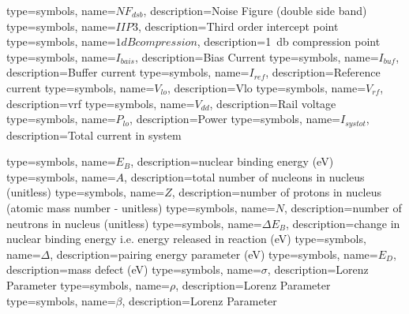 
{
    type=symbols,
    name={\ensuremath{NF_{dsb}}},
    description={Noise Figure (double side band)}
}
{
    type=symbols,
    name={\ensuremath{IIP3}},
    description={Third order intercept point}
}
{
    type=symbols,
    name={\ensuremath{1dB compression}},
    description={\SI{1}{\decibel} compression point}
}
{
    type=symbols,
    name={\ensuremath{I_{bais}}},
    description={Bias Current}
}
{
    type=symbols,
    name={\ensuremath{I_{buf}}},
    description={Buffer current}
}
{
    type=symbols,
    name={\ensuremath{I_{ref}}},
    description={Reference current}
}
{
    type=symbols,
    name={\ensuremath{V_{lo}}},
    description={Vlo}
}
{
    type=symbols,
    name={\ensuremath{V_{rf}}},
    description={vrf}
}
{
    type=symbols,
    name={\ensuremath{V_{dd}}},
    description={Rail voltage}
}
{
    type=symbols,
    name={\ensuremath{P_{lo}}},
    description={Power}
}
{
    type=symbols,
    name={\ensuremath{I_{systot}}},
    description={Total current in system}
}


{
    type=symbols,
    name={\ensuremath{E_{B}}},
    description={nuclear binding energy (\si{\electronvolt})}
}
{
    type=symbols,
    name={\ensuremath{A}},
    description={total number of nucleons in nucleus (unitless)}
}
{
    type=symbols,
    name={\ensuremath{Z}},
    description={number of protons in nucleus (atomic mass number - unitless)}
}
{
    type=symbols,
    name={\ensuremath{N}},
    description={number of neutrons in nucleus (unitless)}
}
{
    type=symbols,
    name={\ensuremath{\Delta E_{B}}},
    description={change in nuclear binding energy i.e. energy released in reaction (\si{\electronvolt})}
}
{
    type=symbols,
    name={\ensuremath{\Delta}},
    description={pairing energy parameter (\si{\electronvolt})}
}
{
    type=symbols,
    name={\ensuremath{E_{D}}},
    description={mass defect (\si{\electronvolt})}
}
{
    type=symbols,
    name={\ensuremath{\sigma}},
    description={Lorenz Parameter}
}
{
    type=symbols,
    name={\ensuremath{\rho}},
    description={Lorenz Parameter}
}
{
    type=symbols,
    name={\ensuremath{\beta}},
    description={Lorenz Parameter}
}


